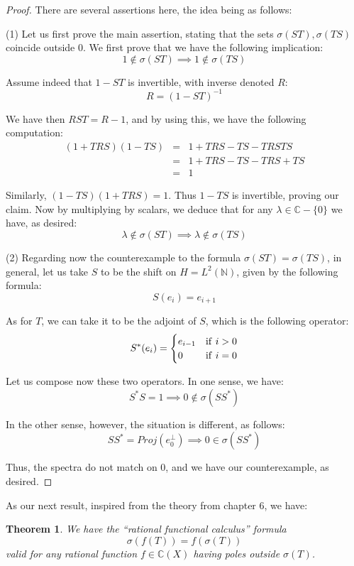 \documentclass[12pt]{amsbook}
\newtheorem{theorem}{Theorem}[chapter]
\begin{document}
\begin{proof}
There are several assertions here, the idea being as follows:

\medskip

(1) Let us first prove the main assertion, stating that the sets $\sigma(ST),\sigma(TS)$ coincide outside 0. We first prove that we have the following implication:
$$1\notin\sigma(ST)\implies1\notin\sigma(TS)$$

Assume indeed that $1-ST$ is invertible, with inverse denoted $R$:
$$R=(1-ST)^{-1}$$

We have then $RST=R-1$, and by using this, we have the following computation:
\begin{eqnarray*}
(1+TRS)(1-TS)
&=&1+TRS-TS-TRSTS\\
&=&1+TRS-TS-TRS+TS\\
&=&1
\end{eqnarray*}

Similarly, $(1-TS)(1+TRS)=1$. Thus $1-TS$ is invertible, proving our claim. Now by multiplying by scalars, we deduce that for any $\lambda\in\mathbb C-\{0\}$ we have, as desired:
$$\lambda\notin\sigma(ST)\implies\lambda\notin\sigma(TS)$$

(2) Regarding now the counterexample to the formula $\sigma(ST)=\sigma(TS)$, in general, let us take $S$ to be the shift on $H=L^2(\mathbb N)$, given by the following formula:
$$S(e_i)=e_{i+1}$$

As for $T$, we can take it to be the adjoint of $S$, which is the following operator:
$$S^*(e_i)=\begin{cases}
e_{i-1}&{\rm if}\ i>0\\
0&{\rm if}\ i=0
\end{cases}$$

Let us compose now these two operators. In one sense, we have:
$$S^*S=1\implies 0\notin\sigma(SS^*)$$

In the other sense, however, the situation is different, as follows:
$$SS^*=Proj(e_0^\perp)\implies 0\in\sigma(SS^*)$$

Thus, the spectra do not match on $0$, and we have our counterexample, as desired.
\end{proof}

As our next result, inspired from the theory from chapter 6, we have:


\begin{theorem}
We have the ``rational functional calculus'' formula
$$\sigma(f(T))=f(\sigma(T))$$
valid for any rational function $f\in\mathbb C(X)$ having poles outside $\sigma(T)$.
\end{theorem}
\end{document}

